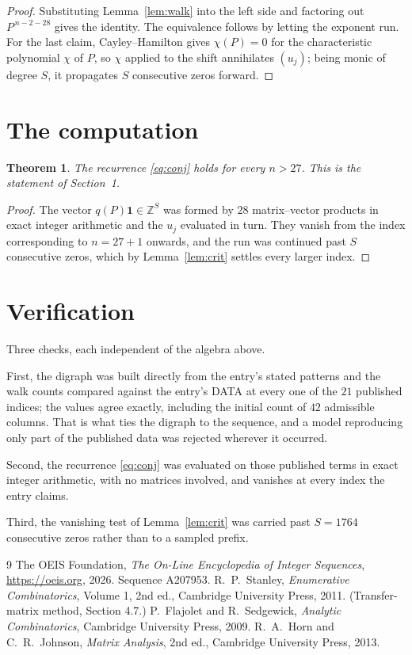 \documentclass[11pt,a4paper]{article}
\theoremstyle{plain}
\newtheorem{theorem}{Theorem}
\theoremstyle{definition}
\begin{document}
\begin{proof}
Substituting Lemma~\ref{lem:walk} into the left side and factoring out
$P^{\,n-2-28}$ gives the identity. The equivalence follows by letting the exponent
run. For the last claim, Cayley--Hamilton gives $\chi(P)=0$ for the characteristic
polynomial $\chi$ of $P$, so $\chi$ applied to the shift annihilates $(u_j)$; being monic of
degree $S$, it propagates $S$ consecutive zeros forward.
\end{proof}

\section{The computation}

\begin{theorem}
The recurrence \eqref{eq:conj} holds for every $n>27$. This is the statement of
Section~1.
\end{theorem}

\begin{proof}
The vector $q(P)\mathbf{1}\in\mathbb{Z}^{S}$ was formed by $28$ matrix--vector
products in exact integer arithmetic and the $u_j$ evaluated in turn. They vanish from the
index corresponding to $n=27+1$ onwards, and the run was continued past $S$ consecutive
zeros, which by Lemma~\ref{lem:crit} settles every larger index.
\end{proof}

\section{Verification}

Three checks, each independent of the algebra above.

First, the digraph was built directly from the entry's stated patterns and the walk counts
compared against the entry's DATA at every one of the $21$ published indices; the
values agree exactly, including the initial count of $42$ admissible columns. That is
what ties the digraph to the sequence, and a model reproducing only part of the published
data was rejected wherever it occurred.

Second, the recurrence \eqref{eq:conj} was evaluated on those published terms in exact
integer arithmetic, with no matrices involved, and vanishes at every index the entry claims.

Third, the vanishing test of Lemma~\ref{lem:crit} was carried past $S=1764$ consecutive
zeros rather than to a sampled prefix.

\begin{thebibliography}{9}
 The OEIS Foundation, \emph{The On-Line Encyclopedia of Integer
Sequences}, \url{https://oeis.org}, 2026. Sequence A207953.
 R.~P.~Stanley, \emph{Enumerative Combinatorics}, Volume 1, 2nd ed.,
Cambridge University Press, 2011. (Transfer-matrix method, Section 4.7.)
 P.~Flajolet and R.~Sedgewick, \emph{Analytic Combinatorics}, Cambridge
University Press, 2009.
 R.~A.~Horn and C.~R.~Johnson, \emph{Matrix Analysis}, 2nd ed., Cambridge
University Press, 2013.
\end{thebibliography}
\end{document}
